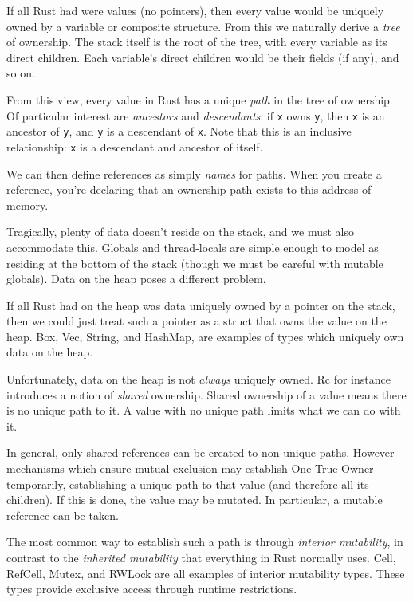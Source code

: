 \documentclass[a4paper,]{book}
\begin{document}
If all Rust had were values (no pointers), then every value would be
uniquely owned by a variable or composite structure. From this we
naturally derive a \emph{tree} of ownership. The stack itself is the
root of the tree, with every variable as its direct children. Each
variable's direct children would be their fields (if any), and so on.

From this view, every value in Rust has a unique \emph{path} in the tree
of ownership. Of particular interest are \emph{ancestors} and
\emph{descendants}: if \texttt{x} owns \texttt{y}, then \texttt{x} is an
ancestor of \texttt{y}, and \texttt{y} is a descendant of \texttt{x}.
Note that this is an inclusive relationship: \texttt{x} is a descendant
and ancestor of itself.

We can then define references as simply \emph{names} for paths. When you
create a reference, you're declaring that an ownership path exists to
this address of memory.

Tragically, plenty of data doesn't reside on the stack, and we must also
accommodate this. Globals and thread-locals are simple enough to model
as residing at the bottom of the stack (though we must be careful with
mutable globals). Data on the heap poses a different problem.

If all Rust had on the heap was data uniquely owned by a pointer on the
stack, then we could just treat such a pointer as a struct that owns the
value on the heap. Box, Vec, String, and HashMap, are examples of types
which uniquely own data on the heap.

Unfortunately, data on the heap is not \emph{always} uniquely owned. Rc
for instance introduces a notion of \emph{shared} ownership. Shared
ownership of a value means there is no unique path to it. A value with
no unique path limits what we can do with it.

In general, only shared references can be created to non-unique paths.
However mechanisms which ensure mutual exclusion may establish One True
Owner temporarily, establishing a unique path to that value (and
therefore all its children). If this is done, the value may be mutated.
In particular, a mutable reference can be taken.

The most common way to establish such a path is through \emph{interior
mutability}, in contrast to the \emph{inherited mutability} that
everything in Rust normally uses. Cell, RefCell, Mutex, and RWLock are
all examples of interior mutability types. These types provide exclusive
access through runtime restrictions.
\end{document}
